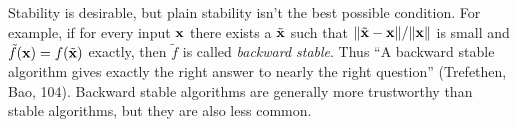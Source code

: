 Stability is desirable, but plain stability isn't the best possible condition.
For example, if for every input $\mathbf{x}$ there exists a $\tilde{\mathbf{x}}$ such that
$\|\tilde{\mathbf{x}} - \mathbf{x}\| / \|\mathbf{x}\|$ is small and $\tilde{f}(\mathbf{x}) = f(\tilde{\mathbf{x}})$ exactly, then $\tilde{f}$ is called \emph{backward stable}.
Thus ``A backward stable algorithm gives exactly the right answer to nearly the right question'' (Trefethen, Bao, 104).
Backward stable algorithms are generally more trustworthy than stable algorithms, but they are also less common.

